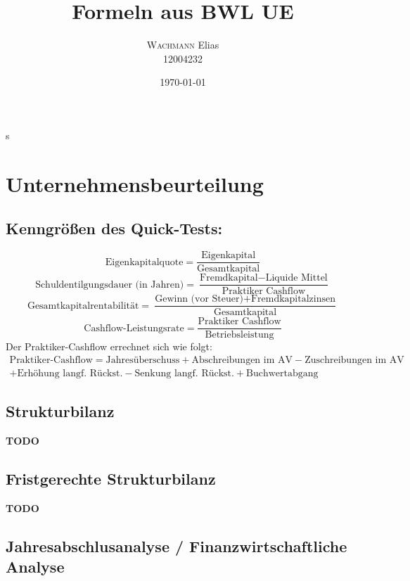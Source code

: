 \documentclass[11pt]{scrartcl}
\begin{document}
\title{Formeln aus BWL UE}
\author{\textsc{Wachmann} Elias\\12004232}
\date{\today}
\maketitle

\tableofcontents
s\newpage
\section{Unternehmensbeurteilung}
\subsection{Kenngrößen des Quick-Tests:}

\begin{equation}
    \text{Eigenkapitalquote} = \frac{\text{Eigenkapital}}{\text{Gesamtkapital}}
\end{equation}
\begin{equation}
    \text{Schuldentilgungsdauer (in Jahren)} = \frac{\text{Fremdkapital} - \text{Liquide Mittel}}{\text{Praktiker Cashflow}}
\end{equation}
\begin{equation}
    \text{Gesamtkapitalrentabilität} = \frac{\text{Gewinn (vor Steuer)} + \text{Fremdkapitalzinsen}}{\text{Gesamtkapital}}
\end{equation}
\begin{equation}
    \text{Cashflow-Leistungsrate} = \frac{\text{Praktiker Cashflow}}{\text{Betriebsleistung}} 
\end{equation}
Der Praktiker-Cashflow errechnet sich wie folgt: 
\begin{multline*}
    \text{Praktiker-Cashflow} = \text{Jahresüberschuss} +\text{Abschreibungen im AV} - \text{Zuschreibungen im AV}\\ + \text{Erhöhung langf. Rückst.} - \text{Senkung langf. Rückst.} + \text{Buchwertabgang}
\end{multline*}
\subsection{Strukturbilanz}
\textbf{TODO}
\subsection{Fristgerechte Strukturbilanz}
\textbf{TODO}
\subsection{Jahresabschlusanalyse / Finanzwirtschaftliche Analyse}
\end{document}

